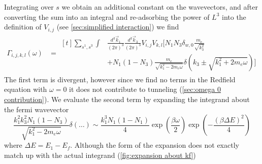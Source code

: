 Integrating over \(s\) we obtain
an additional constant on the
wavevectors, and after
converting the sum into
an integral and re-adsorbing
the power of \(L^3\) into the
definition of \(V_{i,j}\)
(see \cref{sec:simplified interaction})
we find
\begin{align}
    \Gamma_{i,j, k,l}(\omega) & =\begin{aligned}[t]
        \sum_{s^1,s^3} \int &
        \frac{d^3\vec{k}_1}{{(2\pi)}^3}
        \frac{d^3\vec{k}_3}{{(2\pi)}^3}
        V_{i,j} V_{k,l} [
        N_1 N_3 \delta_{w, 0} \frac{m_e}{\sqrt{k_3^2}} \\
                            & + N_1 (1 - N_3)
                \frac{m_e}{\sqrt{k_1^2 - 2m_e\omega}}
                \delta({k_3 \pm \sqrt{k_1^2 + 2m_e\omega}}) ]
    \end{aligned}\label{eqn:gamma integral form}
\end{align}
The first term is divergent, however
since we find no terms in the Redfield
equation with \(\omega = 0\)
it does not contribute to tunneling
(\cref{sec:omega 0 contribution}).
We evaluate the second term
by expanding the integrand about the fermi
wavevector
\begin{equation}
    \frac{k_1 ^ 2 k_3 ^ 2 N_1 (1 - N_3)}
    {\sqrt{k_1^2 - 2m_e\omega}}
    \delta(\dots)
    \sim
    \frac{k_1 ^ 3 N_1 (1 - N_1)}{4}
    \exp{(\frac{\beta \omega}{2})}
    \exp{(-\frac{{(\beta \Delta E)}^2}{4})}
\end{equation}
where \(\Delta E = E_1 - E_f\).
Although the form of the
expansion does not exactly
match up with the actual
integrand (\cref{fig:expansion about kf})
